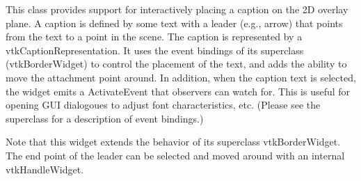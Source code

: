 This class provides support for interactively placing a caption on the 2\-D overlay plane. A caption is defined by some text with a leader (e.\-g., arrow) that points from the text to a point in the scene. The caption is represented by a vtk\-Caption\-Representation. It uses the event bindings of its superclass (vtk\-Border\-Widget) to control the placement of the text, and adds the ability to move the attachment point around. In addition, when the caption text is selected, the widget emits a Activate\-Event that observers can watch for. This is useful for opening G\-U\-I dialogoues to adjust font characteristics, etc. (Please see the superclass for a description of event bindings.)

Note that this widget extends the behavior of its superclass vtk\-Border\-Widget. The end point of the leader can be selected and moved around with an internal vtk\-Handle\-Widget.

